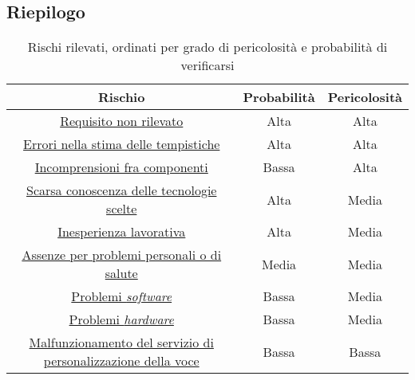 
\subsection{Riepilogo}
\begin{table}[h]
\centering
\bgroup
\def\arraystretch{1.6}
\begin{tabular}{| c | c | c |}
\hline
\textbf{Rischio} & \textbf{Probabilità} & \textbf{Pericolosità}\\ \hline \hline 
\hyperref[sec:ReqNonRil]{Requisito non rilevato} & Alta & Alta \\ \hline
\hyperref[sec:ErrTemp]{Errori nella stima delle tempistiche} & Alta & Alta \\ \hline
\hyperref[sec:Incomp]{Incomprensioni fra componenti} & Bassa & Alta \\ \hline
\hyperref[sec:ScarsTec]{Scarsa conoscenza delle tecnologie scelte} & Alta & Media \\ \hline
\hyperref[sec:IneLav]{Inesperienza lavorativa} & Alta & Media \\ \hline
\hyperref[sec:Assenze]{Assenze per problemi personali o di salute} & Media & Media \\ \hline
\hyperref[sec:PSW]{Problemi \textit{software}} & Bassa & Media \\ \hline
\hyperref[sec:PHW]{Problemi \textit{hardware}} & Bassa & Media \\ \hline
\hyperref[sec:PMalf]{Malfunzionamento del servizio di personalizzazione della voce} & Bassa & Bassa \\ \hline
\end{tabular}
\egroup
\caption{Rischi rilevati, ordinati per grado di pericolosità e probabilità di verificarsi}
\end{table}

\newpage
